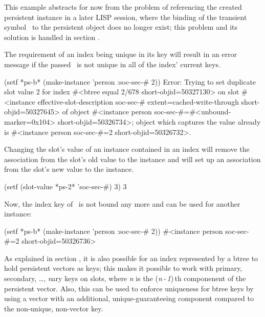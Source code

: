 This example abstracts for now from the problem of referencing the
created persistent instance in a later LISP session, where the binding
of the transient symbol \ to the persistent object does
no longer exist; this problem and its solution is handled in
section .

The requirement of an index being unique in its key will result in an error message if the
passed \ is not unique in all of the index' current
keys.
\begin{CompactCode}
\listener{}(setf *ps-b* (make-instance 'person :soc-sec-# 2))
Error: Trying to set duplicate slot value 2 for index
       #<btree equal 2/678 short-objid=50327130> on slot
       #<instance effective-slot-description soc-sec-#
                  extent=cached-write-through
                  short-objid=50327645>
       of object #<instance person soc-sec-#=#<unbound-marker=0x104>
                            short-objid=50326734>;
       object which captures the value already is
       #<instance person soc-sec-#=2 short-objid=50326732>.
\end{CompactCode}

Changing the slot's value of an instance contained in an index will
remove the association from the slot's old value to the instance and
will set up an association from the slot's new value to the instance.
\begin{CompactCode}
\listener{}(setf (slot-value *ps-2* 'soc-sec-#) 3)
3
\end{CompactCode}
Now, the index key of \ is not bound any more and can be used
for another instance:
\begin{CompactCode}
\listener{}(setf *ps-b* (make-instance 'person :soc-sec-# 2))
#<instance person soc-sec-#=2 short-objid=50326736>
\end{CompactCode}

As explained in section , it is
also possible for an index represented by a btree to hold persistent
vectors as keys; this makes it possible to work with primary,
secondary, \ldots, \emph{n}ary keys on slots, where \emph{n} is the
(\emph{n\,-\,1})\,th componenent of the persistent vector. Also, this
can be used to enforce uniqueness for btree keys by using a vector
with an additional, unique-guaranteeing component compared to the
non-unique, non-vector key.

